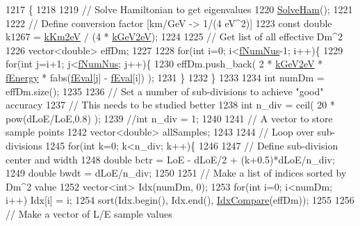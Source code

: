 \begin{DoxyCode}
1217 \{
1218 
1219   \textcolor{comment}{// Solve Hamiltonian to get eigenvalues}
1220   \hyperlink{classOscProb_1_1PMNS__Base_a91f065cb9e910e0095e41462b4420b01}{SolveHam}();
1221 
1222   \textcolor{comment}{// Define conversion factor [km/GeV -> 1/(4 eV^2)]}
1223   \textcolor{keyword}{const} \textcolor{keywordtype}{double} k1267 = \hyperlink{classOscProb_1_1PMNS__Base_a382ddd7b76ca89b43f22614a2ea7327b}{kKm2eV} / (4 * \hyperlink{classOscProb_1_1PMNS__Base_ad36a0a6bf58d6ec093d3947784bd89e9}{kGeV2eV});
1224 
1225   \textcolor{comment}{// Get list of all effective Dm^2}
1226   vector<double> effDm;
1227 
1228   \textcolor{keywordflow}{for}(\textcolor{keywordtype}{int} i=0; i<\hyperlink{classOscProb_1_1PMNS__Base_a24bb74bed63569dfe88b18fa6a08060e}{fNumNus}-1; i++)\{
1229     \textcolor{keywordflow}{for}(\textcolor{keywordtype}{int} j=i+1; j<\hyperlink{classOscProb_1_1PMNS__Base_a24bb74bed63569dfe88b18fa6a08060e}{fNumNus}; j++)\{
1230       effDm.push\_back( 2 * \hyperlink{classOscProb_1_1PMNS__Base_ad36a0a6bf58d6ec093d3947784bd89e9}{kGeV2eV} * \hyperlink{classOscProb_1_1PMNS__Base_a2800af6d436972f3e900867790c046b0}{fEnergy} * fabs(\hyperlink{classOscProb_1_1PMNS__Base_a6319c34d7decbb9d7d6da279c06e8c2d}{fEval}[j] - 
      \hyperlink{classOscProb_1_1PMNS__Base_a6319c34d7decbb9d7d6da279c06e8c2d}{fEval}[i]) );
1231     \}
1232   \}
1233 
1234   \textcolor{keywordtype}{int} numDm = effDm.size();
1235 
1236   \textcolor{comment}{// Set a number of sub-divisions to achieve "good" accuracy}
1237   \textcolor{comment}{// This needs to be studied better}
1238   \textcolor{keywordtype}{int} n\_div = ceil( 20 * pow(dLoE/LoE,0.8) );
1239   \textcolor{comment}{//int n\_div = 1;}
1240 
1241   \textcolor{comment}{// A vector to store sample points}
1242   vector<double> allSamples;
1243 
1244   \textcolor{comment}{// Loop over sub-divisions}
1245   \textcolor{keywordflow}{for}(\textcolor{keywordtype}{int} k=0; k<n\_div; k++)\{
1246 
1247     \textcolor{comment}{// Define sub-division center and width}
1248     \textcolor{keywordtype}{double} bctr = LoE - dLoE/2 + (k+0.5)*dLoE/n\_div;
1249     \textcolor{keywordtype}{double} bwdt = dLoE/n\_div;
1250 
1251     \textcolor{comment}{// Make a list of indices sorted by Dm^2 value}
1252     vector<int> Idx(numDm, 0);
1253     \textcolor{keywordflow}{for}(\textcolor{keywordtype}{int} i=0; i<numDm; i++) Idx[i] = i;
1254     sort(Idx.begin(), Idx.end(), \hyperlink{structOscProb_1_1IdxCompare}{IdxCompare}(effDm));
1255 
1256     \textcolor{comment}{// Make a vector of L/E sample values}

\end{DoxyCode}
